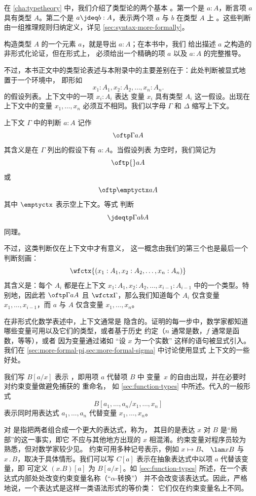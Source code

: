 在 \cref{cha:typetheory} 中，我们介绍了类型论的两个基本
。第一个是 $a:A$，断言项 $a$ 具有类型 $A$。第二个是
$a\jdeq b:A$，表示两个项 $a$ 与 $b$ 在类型 $A$ 上%
。这些判断由一组推理规则归纳定义，详见 \cref{sec:syntax-more-formally}。

构造类型 $A$ 的一个元素 $a$，就是导出 $a:A$；在本书中，我们
给出描述 $a$ 之构造的非形式化论证，但在形式上，
必须给出一个精确的项 $a$ 以及 $a:A$ 的完整推导。

不过，本书正文中的类型论表述与本附录中的主要差别在于：此处判断被显式地
置于一个环境中，
即形如
\[
  x_1:A_1, x_2:A_2,\dots,x_n:A_n.
\]
的假设列表。上下文中的一项 $x_i : A_i$ 表达
变量
%
$x_i$ 具有类型 $A_i$ 这一假设。出现在
上下文中的变量 $x_1, \ldots, x_n$ 必须互不相同。我们以字母 $\Gamma$
和 $\Delta$ 缩写上下文。

上下文 $\Gamma$ 中的判断 $a:A$ 记作
\[ \oftp\Gamma aA \]
其含义是在 $\Gamma$ 列出的假设下有 $a:A$。当假设列表
为空时，我们简记为
\[ \oftp{}aA \]
或
\[ \oftp\emptyctx aA \]
其中 $\emptyctx$ 表示空上下文。等式
判断
\[
  \jdeqtp\Gamma{a}{b}{A}
\]
同理。

不过，这类判断仅在上下文中才有意义，
%
这一概念由我们的第三个也是最后一个判断刻画：
\[
  \wfctx{(x_1:A_1, x_2:A_2,\dots,x_n:A_n)}
\]
其含义是：每个 $A_i$ 都是在上下文 $x_1:A_1,
x_2:A_2,\dots,x_{i-1}:A_{i-1}$ 中的一个类型。特别地，因此若 $\oftp\Gamma aA$ 且
$\wfctx\Gamma$，那么我们知道每个 $A_i$ 仅含变量
$x_1,\dots,x_{i-1}$，而 $a$ 与 $A$ 仅含变量
$x_1,\dots,x_n$。

在非形式化数学表述中，上下文通常是
隐含的。证明的每一步中，数学家都知道
哪些变量可用以及它们的类型，或者基于历史
约定（$n$ 通常是数，$f$ 通常是函数，等等），或者
因为变量通过诸如
``设 $x$ 为一个实数'' 这样的语句被显式引入。我们在 \cref{sec:more-formal-pi,sec:more-formal-sigma} 中讨论使用显式
上下文的一些好处。

我们写 $B[a/x]$ 表示
%
，即用项 $a$ 代替项 $B$ 中
变量~$x$ 的自由出现，并在必要时对约束变量做避免捕获的
重命名，
%
如
\cref{sec:function-types} 中所述。代入的一般形式
%
\[
   B[a_1,\dots,a_n/x_1,\dots,x_n]
\]
%
表示同时用表达式 $a_1,\dots,a_n$ 代替变量
$x_1,\dots,x_n$。

对
%
是指把两者组合成一个更大的表达式，称为，
%
其目的是表达 $x$ 对 $B$ 是“局部”的这一事实，即它
不应与其他地方出现的 $x$ 相混淆。约束变量对程序员较为熟悉，但对数学家较少见。
约束可用多种记号表示，例如 $x \mapsto B$、
$\lam x B$ 与 $x \, .\, B$，取决于具体情形。我们可以写 $C[a]$ 表示在抽象表达式中以项 $a$ 代替该变量，即
可定义 $(x.B)[a]$ 为 $B[a/x]$。如
\cref{sec:function-types} 所述，在一个表达式内部处处改变约束变量名称（“$\alpha$-转换”）
%
并不会改变该表达式。因此，严格地说，一个表达式是这样一类语法形式的等价类：
它们仅在约束变量名上不同。

